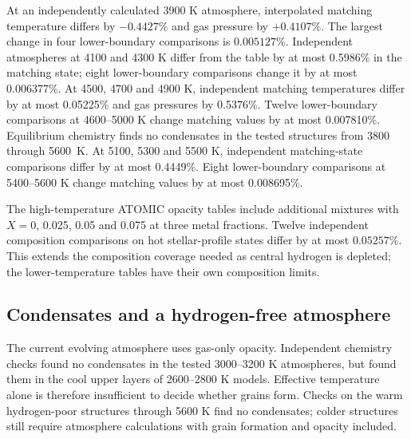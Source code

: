 \documentclass[11pt,letterpaper]{article}
\begin{document}
At an independently calculated 3900 K atmosphere, interpolated matching
temperature differs by $-0.4427\%$ and gas pressure by $+0.4107\%$.
The largest change in four lower-boundary comparisons is $0.005127\%$.
Independent atmospheres at
4100 and 4300 K differ from the table by at most 0.5986\% in the matching
state; eight lower-boundary comparisons change it by at most 0.006377\%.
At 4500, 4700 and 4900 K, independent matching temperatures differ by at most
0.05225\% and gas pressures by 0.5376\%. Twelve lower-boundary comparisons
at 4600--5000 K change matching values by at most 0.007810\%.
Equilibrium chemistry finds no condensates in the tested structures from
3800 through 5600~K. At 5100, 5300 and 5500 K, independent matching-state
comparisons differ by at most 0.4449\%. Eight lower-boundary comparisons
at 5400--5600 K change matching values by at most 0.008695\%.

The high-temperature ATOMIC opacity tables include additional mixtures with
$X=0$, 0.025, 0.05 and 0.075 at three metal fractions. Twelve independent
composition comparisons on hot stellar-profile states differ by at most
$0.05257\%$. This extends the composition coverage needed as central hydrogen
is depleted; the lower-temperature tables have their own composition limits.

\subsection{Condensates and a hydrogen-free atmosphere}
The current evolving atmosphere uses gas-only opacity. Independent chemistry
checks found no condensates in the tested 3000--3200 K atmospheres, but found
them in the cool upper layers of 2600--2800 K models. Effective temperature
alone is therefore insufficient to decide whether grains form. Checks on the
warm hydrogen-poor structures through 5600 K find no condensates;
colder structures still require atmosphere calculations with grain formation
and opacity included.
\end{document}
